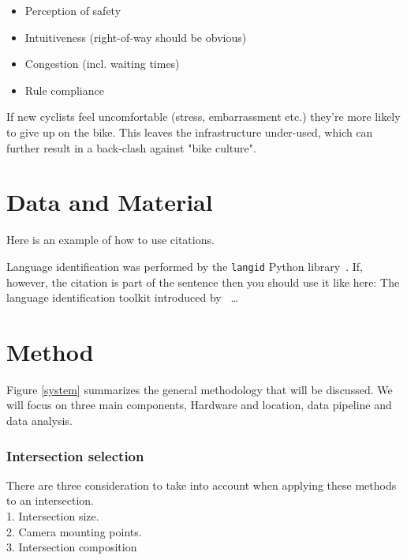 \documentclass[
10pt, %
a4paper, %
oneside, %
headinclude,footinclude, %
] {book}%
\begin{document}
\begin{itemize}
	\item Perception of safety
	\item Intuitiveness (right-of-way should be obvious)
	\item Congestion (incl. waiting times)
	\item Rule compliance
\end{itemize}

If new cyclists feel uncomfortable (stress, embarrassment etc.) they're more likely to give up on the bike. This leaves the infrastructure 
under-used, which can further result in a back-clash against "bike culture".

\chapter{Data and Material}
\label{datagathering}

Here is an example of how to use citations.

Language identification was performed by the \texttt{langid} Python library~\citep{langid}. If, however, the citation is part of the sentence then you should use it like here: The language identification toolkit introduced by~\cite{langid}
\ldots

\chapter{Method}

Figure \ref{system} summarizes the general methodology that will be discussed. We will focus
on three main components, Hardware and location, data pipeline and data analysis.

\subsection{Intersection selection}
There are three consideration to take into account when applying these methods to an intersection.
\ \\
1. Intersection size.
\ \\
2. Camera mounting points.
\ \\
3. Intersection composition
\end{document}
